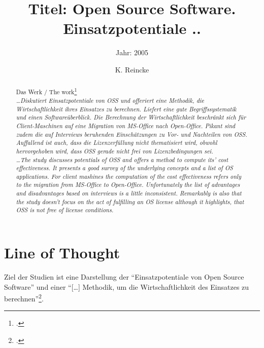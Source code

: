 \documentclass[DIV=calc,BCOR=5mm,11pt,headings=small,oneside,abstract=true, toc=bib]{scrartcl}
\begin{document}

\titlehead{Literaturexzerpt}
\subject{Autor(en): Renner, Thomas \ldots}
\title{Titel: Open Source Software. Einsatzpotentiale ..}
\subtitle{Jahr: 2005 }
\author{K. Reincke}

\maketitle

\begin{abstract}
\noindent
Das Werk / The work\footcite[][]{RenVetRexKet2005a} \\
\noindent \itshape
\ldots Diskutiert Einsatzpotentiale von OSS und offeriert eine Methodik, die
Wirtschaftlichkeit ihres Einsatzes zu berechnen. Liefert eine gute
Begriffssystematik und einen Softwareüberblick. Die Berechnung der
Wirtschaftlichkeit beschränkt sich für Client-Maschinen auf eine Migration von
MS-Office nach Open-Office. Pikant sind zudem die auf Interviews beruhenden
Einschätzungen zu Vor- und Nachteilen von OSS. Auffallend ist auch, dass die
Lizenzerfüllung nicht thematisiert wird, obwohl hervorgehoben wird, dass OSS
gerade nicht frei von Lizenzbedingungen sei. \\
\noindent
\ldots The study discusses potentials of OSS and offers a method to compute its'
cost effectiveness. It presents a good survey of the underlying concepts and a
list of OS applications. For client mashines the computation of the cost
effectiveness refers only to the migration from MS-Office to Open-Office.
Unfortunately the list of advantages and disadvantages based on interviews is a
little inconsistent. Remarkably is also that the study doesn't focus on the act
of fulfilling an OS license although it highlights, that OSS is not free of
license conditions.

\end{abstract}
\footnotesize
\normalsize

\section{Line of Thought}

Ziel der Studien ist eine Darstellung der \enquote{Einsatzpotentiale von
Open Source Software} und einer \enquote{[\ldots] Methodik, um die
Wirtschaftlichkeit des Einsatzes zu
berechnen}\footcite[vgl.][10]{RenVetRexKet2005a}.
\end{document}
